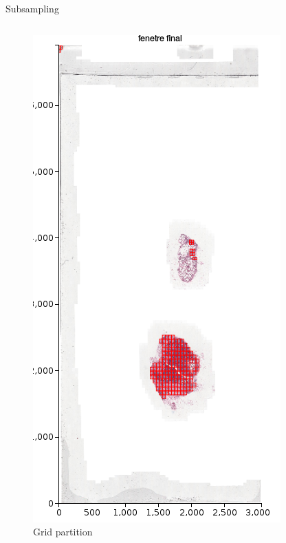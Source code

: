 \documentclass{beamer}
\begin{document}
\begin{frame}[noframenumbering]{Subsampling}
\begin{columns}[T]
\begin{column}{.25\textwidth}
\begin{figure}[!ht]
\centering
\includegraphics[width=\textwidth]{Grid.png}
\caption{Grid partition}
\label{}
\end{figure}
\end{column}%
\end{columns}
\end{frame}
\end{document}
